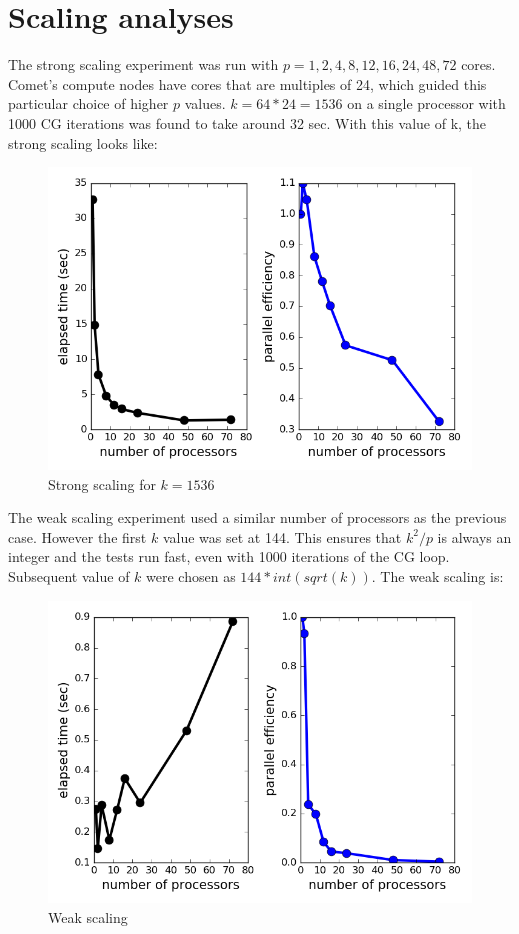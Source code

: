 \documentclass[12pt,letterpaper]{article}
\begin{document}
\section*{Scaling analyses}
\noindent The strong scaling experiment was run with $p = 1, 2, 4, 8, 12, 16, 24, 48, 72$ cores. Comet's compute nodes have cores that are multiples of 24, which guided this particular choice of higher $p$ values. $k = 64 * 24 = 1536$ on a single processor with 1000 CG iterations was found to take around 32 sec. With this value of k, the strong scaling looks like:
%
\begin{figure}[h]
\centering
\includegraphics[scale = 0.7]{strongscale.png}
\caption{Strong scaling for $ k = 1536$}
\end{figure}
%
\newpage
\noindent The weak scaling experiment used a similar number of processors as the previous case. However the first $k$ value was set at 144. This ensures that $k^2/p$ is always an integer and the tests run fast, even with 1000 iterations of the CG loop. Subsequent value of $k$ were chosen as $144 * int(sqrt(k))$. The weak scaling is:
%
\begin{figure}[h]
\centering
\includegraphics[scale = 0.7]{weakscale.png}
\caption{Weak scaling}
\end{figure}
\end{document}
